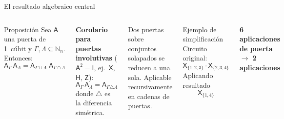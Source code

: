 \documentclass[12pt, aspectratio=169]{beamer}
\newcommand{\qg}[1]{\mathsf{#1}}
\begin{document}
\begin{frame}{El resultado algebraico central}
  \begin{columns}[T]
    \begin{block}{Proposición}
      Sea $\qg{A}$ una puerta de 1~cúbit y $\Gamma, \Lambda \subseteq \mathbb{N}_n$. Entonces:
      \[
        \boxed{\qg{A}_\Gamma\,\qg{A}_\Lambda
          = \qg{A}_{\Gamma \cup \Lambda}\;\qg{A}_{\Gamma \cap \Lambda}}
      \]
    \end{block}

    \medskip
    \textbf{Corolario para puertas involutivas} ($\qg{A}^2 = \qg{I}$,
    ej.\ $\qg{X}$, $\qg{H}$, $\qg{Z}$):
    \[
      \qg{A}_\Gamma\,\qg{A}_\Lambda = \qg{A}_{\Gamma \triangle \Lambda}
    \]
    donde $\triangle$ es la diferencia simétrica.

    \medskip
    \alert{Dos puertas sobre conjuntos solapados se reducen a una sola.}
    Aplicable recursivamente en cadenas de puertas.

    \begin{exampleblock}{Ejemplo de simplificación}
      \small
      Circuito original:
      \[
        \qg{X}_{\{1,2,3\}} \cdot \qg{X}_{\{2,3,4\}}
      \]
      Aplicando resultado
      \[
        \qg{X}_{\{1,4\}}
      \]
    \end{exampleblock}

    \begin{exampleblock}{}
      \centering\small
      \textbf{6 aplicaciones de puerta} $\rightarrow$ \textbf{2 aplicaciones}
    \end{exampleblock}
  \end{columns}
\end{frame}

\end{document}

